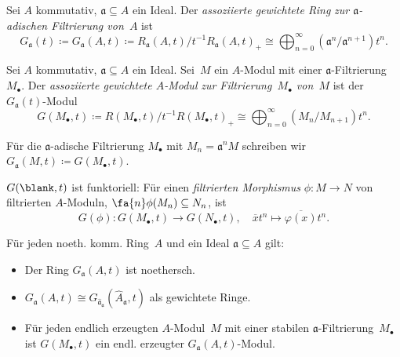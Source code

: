 \documentclass{cheat-sheet}
\newcommand{\aaa}{\mathfrak{a}}
\begin{document}

\begin{defn}
  Sei $A$ kommutativ, $\aaa \subseteq A$ ein Ideal.
  Der \emph{assoziierte gewichtete Ring} \textit{zur $\aaa$-adischen Filtrierung von~$A$} ist
  \[
    G_\aaa (t) \coloneqq G_\aaa (A, t) \coloneqq R_\aaa (A, t) / t^{-1} R_\aaa (A, t)_{+} \cong {\bigoplus}_{n=0}^\infty (\aaa^n / \aaa^{n+1}) t^n.
  \]
\end{defn}

\begin{defn}
  Sei $A$ kommutativ, $\aaa \subseteq A$ ein Ideal.
  Sei~$M$ ein $A$-Modul mit einer $\aaa$-Filtrierung~$M_\bullet$.
  Der \emph{assoziierte gewichtete $A$-Modul} \textit{zur Filtrierung~$M_\bullet$ von~$M$} ist der $G_\aaa(t)$-Modul
  \[
    G(M_\bullet, t) \coloneqq R(M_\bullet, t) / t^{-1} R(M_\bullet, t)_{+} \cong \bigoplus_{n=0}^\infty (M_n / M_{n+1}) t^n.
  \]
\end{defn}

\begin{nota}
  Für die $\aaa$-adische Filtrierung $M_\bullet$ mit $M_n = \aaa^n M$ schreiben wir $G_\aaa(M, t) \coloneqq G(M_\bullet, t)$.
\end{nota}

\begin{bem}
  $G(\blank, t)$ ist funktoriell:
  Für einen \textit{filtrierten Morphismus} $\phi : M \to N$ von filtrierten $A$-Moduln, \dh{} $\fa{n} \phi(M_n) \subseteq N_n$, ist
  \[
    G(\phi) : G(M_\bullet, t) \to G(N_\bullet, t), \quad
    \overline{x} t^n \mapsto \overline{\varphi(x)} t^n.
  \]
\end{bem}

\begin{prop}
  Für jeden noeth. komm. Ring~$A$ und ein Ideal $\aaa \subseteq A$ gilt:
  \begin{itemize}
    \item Der Ring $G_\aaa(A, t)$ ist noethersch.
    \item $G_\aaa(A, t) \cong G_{\hat{\aaa}_\aaa}(\hat{A}_\aaa, t)$ als gewichtete Ringe.
    \item Für jeden endlich erzeugten $A$-Modul~$M$ mit einer stabilen $\aaa$-Filtrierung~$M_\bullet$ ist $G(M_\bullet, t)$ ein endl. erzeugter $G_\aaa(A, t)$-Modul.
  \end{itemize}
\end{prop}

\end{document}
